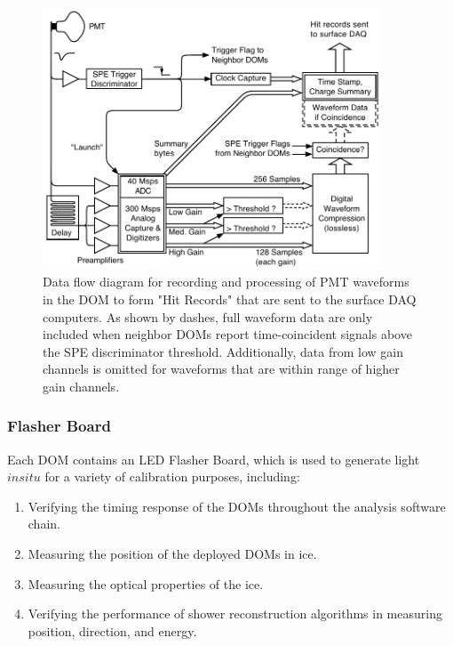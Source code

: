 \begin{figure}[h]
 \centering
 \includegraphics[width=0.9\textwidth]{graphics/dom/functional/domfig3-DOMDataFlow.pdf}
 \caption{Data flow diagram for recording and processing of PMT waveforms in the DOM to form 
 "Hit Records" that are sent to the surface DAQ computers.  As shown by dashes, full waveform data are only included
 when neighbor DOMs report time-coincident signals above the SPE discriminator threshold.  Additionally,
 data from low gain channels is omitted for waveforms that are within range of higher gain channels.}
 \label{fig:domdataflow}
\end{figure}

\subsubsection{\label{sec:flasher}Flasher Board}

Each DOM contains an LED Flasher Board, which is used to generate
light $in situ$ for a
variety of calibration purposes, including: 

\begin{enumerate}
\item Verifying the timing response of the DOMs throughout the analysis
  software chain.
\item Measuring the position of the deployed DOMs in ice.
\item Measuring the optical properties of the ice.
\item Verifying the performance of shower reconstruction algorithms
  in measuring position, direction, and energy.
\end{enumerate}

